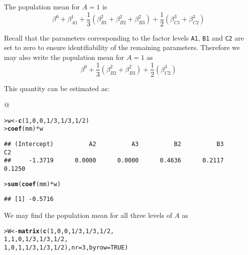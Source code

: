 \documentclass[11pt]{article}\usepackage[]{graphicx}\usepackage[]{color}
\makeatletter
\newcommand{\hlnum}[1]{\textcolor[rgb]{0.686,0.059,0.569}{#1}}%
\newcommand{\hlopt}[1]{\textcolor[rgb]{0,0,0}{#1}}%
\newcommand{\hlstd}[1]{\textcolor[rgb]{0.345,0.345,0.345}{#1}}%
\newcommand{\hlkwb}[1]{\textcolor[rgb]{0.69,0.353,0.396}{#1}}%
\newcommand{\hlkwc}[1]{\textcolor[rgb]{0.333,0.667,0.333}{#1}}%
\newcommand{\hlkwd}[1]{\textcolor[rgb]{0.737,0.353,0.396}{\textbf{#1}}}%
\newenvironment{kframe}{%
 \def\at@end@of@kframe{}%
 \ifinner\ifhmode%
  \def\at@end@of@kframe{\end{minipage}}%
  \begin{minipage}{\columnwidth}%
 \fi\fi%
 \def\FrameCommand##1{\hskip\@totalleftmargin \hskip-\fboxsep
 \colorbox{shadecolor}{##1}\hskip-\fboxsep
     \hskip-\linewidth \hskip-\@totalleftmargin \hskip\columnwidth}%
 \MakeFramed {\advance\hsize-\width
   \@totalleftmargin\z@ \linewidth\hsize
   \@setminipage}}%
 {\par\unskip\endMakeFramed%
 \at@end@of@kframe}
\newenvironment{knitrout}{}{} %
\def\code#1{\texttt{#1}}
\renewenvironment{knitrout}{
  \begin{oldknitrout}
    \footnotesize
    \topsep=0pt
}{
  \end{oldknitrout}
}
\makeatother
\begin{document}
The population mean for $A=1$ is
\begin{equation}
  \label{eq:2}
  \beta^0 + \beta^1_{A1} + \frac{1}{3} (\beta^2_{B1}+\beta^2_{B2}+\beta^2_{B3})
  + \frac{1}{2}(\beta^3_{C1}+\beta^3_{C2})
\end{equation}

Recall that the
parameters corresponding to the factor levels
\code{A1}, \code{B1} and \code{C2} are set to zero to ensure
identifiability of the remaining parameters. Therefore we may also
write the population mean for $A=1$ as
\begin{equation}
  \label{eq:3}
  \beta^0 + \frac{1}{3} (\beta^2_{B2}+\beta^2_{B3})
  + \frac{1}{2}(\beta^3_{C2})
\end{equation}


This quantity can be estimated as:

@
\begin{knitrout}
\color{fgcolor}\begin{kframe}
\begin{alltt}
\hlstd{> }\hlstd{w} \hlkwb{<-} \hlkwd{c}\hlstd{(}\hlnum{1}\hlstd{,} \hlnum{0}\hlstd{,} \hlnum{0}\hlstd{,} \hlnum{1}\hlopt{/}\hlnum{3}\hlstd{,} \hlnum{1}\hlopt{/}\hlnum{3}\hlstd{,} \hlnum{1}\hlopt{/}\hlnum{2}\hlstd{)}
\hlstd{> }\hlkwd{coef}\hlstd{(mm)}\hlopt{*}\hlstd{w}
\end{alltt}
\begin{verbatim}
## (Intercept)          A2          A3          B2          B3          C2 
##     -1.3719      0.0000      0.0000      0.4636      0.2117      0.1250
\end{verbatim}
\begin{alltt}
\hlstd{> }\hlkwd{sum}\hlstd{(}\hlkwd{coef}\hlstd{(mm)}\hlopt{*}\hlstd{w)}
\end{alltt}
\begin{verbatim}
## [1] -0.5716
\end{verbatim}
\end{kframe}
\end{knitrout}


We may find the population mean for all three levels of $A$ as

\begin{knitrout}
\color{fgcolor}\begin{kframe}
\begin{alltt}
\hlstd{> }\hlstd{W} \hlkwb{<-} \hlkwd{matrix}\hlstd{(}\hlkwd{c}\hlstd{(}\hlnum{1}\hlstd{,} \hlnum{0}\hlstd{,} \hlnum{0}\hlstd{,} \hlnum{1}\hlopt{/}\hlnum{3}\hlstd{,} \hlnum{1}\hlopt{/}\hlnum{3}\hlstd{,} \hlnum{1}\hlopt{/}\hlnum{2}\hlstd{,}
\hlstd{  }              \hlnum{1}\hlstd{,} \hlnum{1}\hlstd{,} \hlnum{0}\hlstd{,} \hlnum{1}\hlopt{/}\hlnum{3}\hlstd{,} \hlnum{1}\hlopt{/}\hlnum{3}\hlstd{,} \hlnum{1}\hlopt{/}\hlnum{2}\hlstd{,}
\hlstd{  }              \hlnum{1}\hlstd{,} \hlnum{0}\hlstd{,} \hlnum{1}\hlstd{,} \hlnum{1}\hlopt{/}\hlnum{3}\hlstd{,} \hlnum{1}\hlopt{/}\hlnum{3}\hlstd{,} \hlnum{1}\hlopt{/}\hlnum{2}\hlstd{),}\hlkwc{nr}\hlstd{=}\hlnum{3}\hlstd{,} \hlkwc{byrow}\hlstd{=}\hlnum{TRUE}\hlstd{)}
\end{alltt}
\end{kframe}
\end{knitrout}
\end{document}
